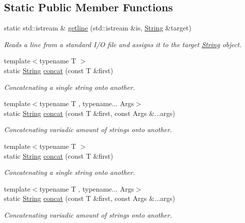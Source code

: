 \subsection*{Static Public Member Functions}
\begin{DoxyCompactItemize}
\item 
static std\+::istream \& \hyperlink{classsparky_1_1_string_aca3e2fc768571c41359767bfb8741946}{getline} (std\+::istream \&is, \hyperlink{classsparky_1_1_string}{String} \&target)
\begin{DoxyCompactList}\small\item\em Reads a line from a standard I/O file and assigns it to the target \hyperlink{classsparky_1_1_string}{String} object. \end{DoxyCompactList}\item 
{\footnotesize template$<$typename T $>$ }\\static \hyperlink{classsparky_1_1_string}{String} \hyperlink{classsparky_1_1_string_aa6103cfa5de311aa254ef1755757ade5}{concat} (const T \&first)
\begin{DoxyCompactList}\small\item\em Concatenating a single string onto another. \end{DoxyCompactList}\item 
{\footnotesize template$<$typename T , typename... Args$>$ }\\static \hyperlink{classsparky_1_1_string}{String} \hyperlink{classsparky_1_1_string_a33ad6774680dbd0c70a18774e4724e01}{concat} (const T \&first, const Args \&...args)
\begin{DoxyCompactList}\small\item\em Concatenating variadic amount of strings onto another. \end{DoxyCompactList}\item 
{\footnotesize template$<$typename T $>$ }\\static \hyperlink{classsparky_1_1_string}{String} \hyperlink{classsparky_1_1_string_aa6103cfa5de311aa254ef1755757ade5}{concat} (const T \&first)
\begin{DoxyCompactList}\small\item\em Concatenating a single string onto another. \end{DoxyCompactList}\item 
{\footnotesize template$<$typename T , typename... Args$>$ }\\static \hyperlink{classsparky_1_1_string}{String} \hyperlink{classsparky_1_1_string_a33ad6774680dbd0c70a18774e4724e01}{concat} (const T \&first, const Args \&...args)
\begin{DoxyCompactList}\small\item\em Concatenating variadic amount of strings onto another. \end{DoxyCompactList}\end{DoxyCompactItemize}


